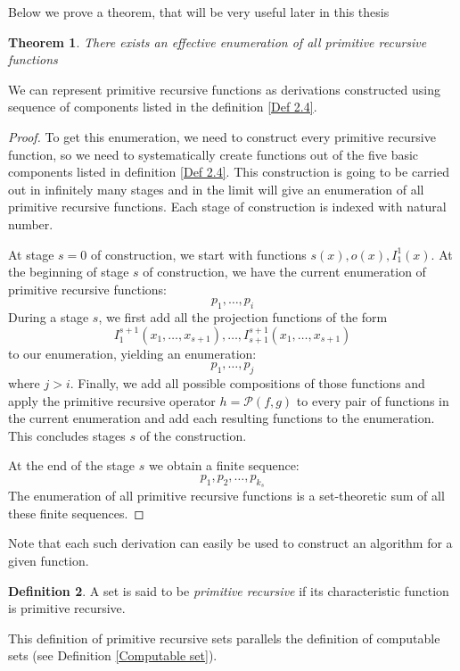 \documentclass{pracalicmgr2025}
\theoremstyle{plain}            %
\newtheorem{theorem}{Theorem}[chapter]
\theoremstyle{remark}           %
\theoremstyle{definition}       %
\newtheorem{definition}[theorem]{Definition}
\begin{document}
Below we prove a theorem, that will be very useful later in this thesis


\begin{theorem} \label{p.r.f enumaration}
There exists an effective enumeration of all primitive recursive functions
    
\end{theorem}

We can represent primitive recursive functions as derivations constructed using sequence of components listed in the definition \ref{Def 2.4}.
\begin{proof}
To get this enumeration, we need to construct every primitive recursive function, so we need to systematically create functions out of the five basic components listed in definition \ref{Def 2.4}. This construction is going to be carried out in infinitely many stages and in the limit will give an enumeration of all primitive recursive functions. Each stage of construction is indexed with natural number.

At stage $s = 0$ of construction, we start with functions $s(x),o(x),I_1^1(x)$. At the beginning of stage $s$ of construction, we have the current enumeration of primitive recursive functions:
$$p_1,\dots,p_i$$ 
During a stage $s$, we first add all the projection functions of the form
$$I^{s+1}_1(x_1,\dots,x_{s+1}),\dots, I^{s+1}_{s+1}(x_1,\dots,x_{s+1})$$
to our enumeration, yielding an enumeration: 
$$p_1,\dots,p_j$$
where $j>i$. Finally, we add all possible compositions of those functions and apply the primitive recursive operator $h = \mathcal{P}(f,g)$ to every pair of functions in the current enumeration and add each resulting functions to the enumeration. This concludes stages $s$ of the construction.

At the end of the stage $s$ we obtain a finite sequence:
$$p_1,p_2, \dots, p_{k_s}$$
The enumeration of all primitive recursive functions is a set-theoretic sum of all these finite sequences.


\end{proof} 
Note that each such derivation can easily be used to construct an algorithm for a given function.
\begin{definition}
    A set is said to be \emph{primitive recursive} if its characteristic function is primitive recursive.
\end{definition}

This definition of primitive recursive sets parallels the definition of computable sets (see Definition \ref{Computable set}).
\end{document}
